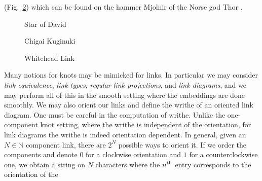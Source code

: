         (Fig.~\ref{fig:whitehead_link}) which can be found on the
        hammer Mjolnir of the Norse god Thor
        \cite[p.~309]{MonteliusMjolnirHopfLink}.
        \begin{figure}
            \centering
            \begin{minipage}[b]{0.49\textwidth}
                \centering
                \caption{Star of David}
                \label{fig:hopf_link_star_of_david}
            \end{minipage}
            \hfill
            \begin{minipage}[b]{0.49\textwidth}
                \centering
                \vspace{2em}
                \caption{Chigai Kuginuki}
                \label{fig:hopf_link_chigai_kuginuki}
            \end{minipage}
        \end{figure}
        \begin{figure}
            \centering
            \caption{Whitehead Link}
            \label{fig:whitehead_link}
        \end{figure}
        \par\hfill\par
        Many notions for knots may be mimicked for links. In particular we may
        consider \textit{link equivalence}, \textit{link types},
        \textit{regular link projections}, and \textit{link diagrams}, and we
        may perform all of this in the smooth setting where the embeddings are
        done smoothly. We may also orient our links and define the
        writhe of an oriented link
        diagram. One must be careful in the computation of writhe. Unlike the
        one-component knot setting, where the writhe is independent of the
        orientation, for link diagrams the writhe is indeed orientation
        dependent. In general, given an $N\in\mathbb{N}$ component link,
        there are $2^{N}$ possible ways to orient it. If we order the
        components and denote $0$ for a clockwise orientation and $1$ for a
        counterclockwise one, we obtain a string on $N$ characters where the
        $n^{\small\textrm{th}}$ entry corresponds to the orientation of the

